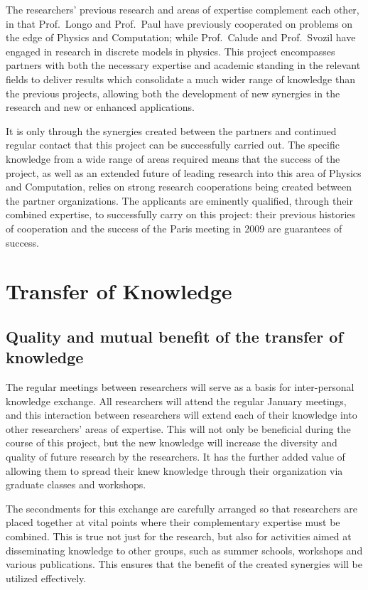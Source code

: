 \documentclass[12pt]{article}
\begin{document}
 The researchers' previous research and areas of expertise complement each other,  in that Prof.\ Longo and Prof.\ Paul have previously cooperated on problems on the edge of Physics and Computation; while Prof.\ Calude and Prof.\ Svozil have engaged in research in discrete models in physics. This project encompasses
 partners with both the necessary expertise and academic standing in the relevant fields to deliver results
 which consolidate a much wider range of knowledge than the previous projects, allowing both the development of new synergies in the research and new or enhanced applications.

It is only through the synergies created between the partners and continued regular contact that this project can be successfully carried out. The specific knowledge from a wide range of areas required means that the success of the project, as well as an extended future of leading research into this area of Physics and Computation, relies on strong research cooperations being created between the partner organizations. The applicants are eminently qualified, through their combined expertise, to successfully carry on this project: their previous histories of cooperation and the success of the Paris meeting in 2009 are guarantees of success.


\section{Transfer of Knowledge}


\subsection{Quality and mutual benefit of the transfer of knowledge}

The regular meetings between researchers will serve as a basis for inter-personal knowledge exchange. All researchers will attend the regular January meetings, and this interaction between researchers will extend each of their knowledge into other researchers' areas of expertise. This will not only be beneficial during the course of this project, but the new knowledge will increase the diversity and quality of future research by the researchers. It has the further added value of allowing them to spread their knew knowledge through their organization via graduate classes and workshops.

The secondments for this exchange are carefully arranged so that researchers are placed together at vital points where their complementary expertise must be combined. This is true not just for the research, but also for activities aimed at disseminating knowledge to other groups, such as summer schools, workshops and  various publications. This ensures that the benefit of the created synergies will be utilized effectively.
\end{document}
